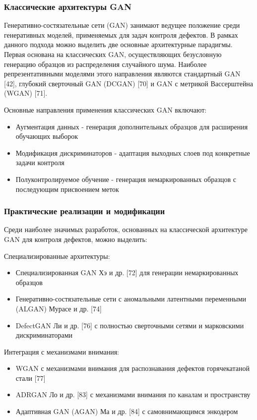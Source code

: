 \documentclass[14pt,a4paper]{article}
\begin{document}
\subsubsection{Классические архитектуры GAN}

Генеративно-состязательные сети (GAN) занимают ведущее положение среди генеративных моделей, применяемых для задач контроля дефектов. В рамках данного подхода можно выделить две основные архитектурные парадигмы. Первая основана на классических GAN, осуществляющих безусловную генерацию образцов из распределения случайного шума. Наиболее репрезентативными моделями этого направления являются стандартный GAN [42], глубокий сверточный GAN (DCGAN) [70] и GAN с метрикой Вассерштейна (WGAN) [71].

Основные направления применения классических GAN включают:
\begin{itemize}
	\item Аугментация данных - генерация дополнительных образцов для расширения обучающих выборок
	\item Модификация дискриминаторов - адаптация выходных слоев под конкретные задачи контроля
	\item Полуконтролируемое обучение - генерация немаркированных образцов с последующим присвоением меток
\end{itemize}

\subsubsection*{Практические реализации и модификации}
Среди наиболее значимых разработок, основанных на классической архитектуре GAN для контроля дефектов, можно выделить:

Специализированные архитектуры:
\begin{itemize}
	\item Специализированная GAN Хэ и др. [72] для генерации немаркированных образцов
	\item Генеративно-состязательные сети с аномальными латентными переменными (ALGAN) Мурасе и др. [74]
	\item DefectGAN Ли и др. [76] с полностью сверточными сетями и марковскими дискриминаторами
\end{itemize}

Интеграция с механизмами внимания:
\begin{itemize}
	\item WGAN с механизмами внимания для распознавания дефектов горячекатаной стали [77]
	\item ADRGAN Ло и др. [83] с механизмами внимания по каналам и пространству
	\item Адаптивная GAN (AGAN) Ма и др. [84] с самовнимающимся энкодером
\end{itemize}
\end{document}

